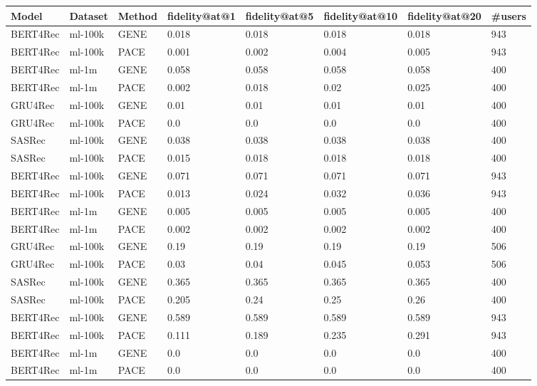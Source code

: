 \begingroup
    \setlength{\tabcolsep}{6pt} %
    \renewcommand{\arraystretch}{1.2} %
    \small %
    \begin{longtable}{|l|l|l|l|l|l|l|l|}
    \hline
\textbf{Model} & \textbf{Dataset} & \textbf{Method} & \textbf{fidelity@at@1} & \textbf{fidelity@at@5} & \textbf{fidelity@at@10} & \textbf{fidelity@at@20} & \textbf{#users} \\ \hline
\endhead
BERT4Rec & ml-100k & GENE & 0.018 & 0.018 & 0.018 & 0.018 & 943 \\ \hline
BERT4Rec & ml-100k & PACE & 0.001 & 0.002 & 0.004 & 0.005 & 943 \\ \hline
BERT4Rec & ml-1m & GENE & 0.058 & 0.058 & 0.058 & 0.058 & 400 \\ \hline
BERT4Rec & ml-1m & PACE & 0.002 & 0.018 & 0.02 & 0.025 & 400 \\ \hline
GRU4Rec & ml-100k & GENE & 0.01 & 0.01 & 0.01 & 0.01 & 400 \\ \hline
GRU4Rec & ml-100k & PACE & 0.0 & 0.0 & 0.0 & 0.0 & 400 \\ \hline
SASRec & ml-100k & GENE & 0.038 & 0.038 & 0.038 & 0.038 & 400 \\ \hline
SASRec & ml-100k & PACE & 0.015 & 0.018 & 0.018 & 0.018 & 400 \\ \hline
BERT4Rec & ml-100k & GENE & 0.071 & 0.071 & 0.071 & 0.071 & 943 \\ \hline
BERT4Rec & ml-100k & PACE & 0.013 & 0.024 & 0.032 & 0.036 & 943 \\ \hline
BERT4Rec & ml-1m & GENE & 0.005 & 0.005 & 0.005 & 0.005 & 400 \\ \hline
BERT4Rec & ml-1m & PACE & 0.002 & 0.002 & 0.002 & 0.002 & 400 \\ \hline
GRU4Rec & ml-100k & GENE & 0.19 & 0.19 & 0.19 & 0.19 & 506 \\ \hline
GRU4Rec & ml-100k & PACE & 0.03 & 0.04 & 0.045 & 0.053 & 506 \\ \hline
SASRec & ml-100k & GENE & 0.365 & 0.365 & 0.365 & 0.365 & 400 \\ \hline
SASRec & ml-100k & PACE & 0.205 & 0.24 & 0.25 & 0.26 & 400 \\ \hline
BERT4Rec & ml-100k & GENE & 0.589 & 0.589 & 0.589 & 0.589 & 943 \\ \hline
BERT4Rec & ml-100k & PACE & 0.111 & 0.189 & 0.235 & 0.291 & 943 \\ \hline
BERT4Rec & ml-1m & GENE & 0.0 & 0.0 & 0.0 & 0.0 & 400 \\ \hline
BERT4Rec & ml-1m & PACE & 0.0 & 0.0 & 0.0 & 0.0 & 400 \\ \hline

\end{longtable}
